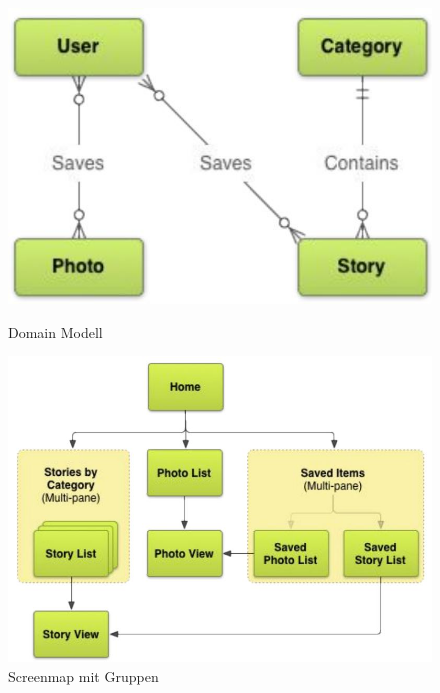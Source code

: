 \begin{figure}[ht!]
	\centering
	\begin{minipage}[t]{0.4\textwidth}
		\centering
		\includegraphics[width=0.7\linewidth]{images/domain_model}
		\caption{Domain Modell}
		\label{fig:domainmodel}
	\end{minipage}
	\begin{minipage}[t]{0.4\textwidth}
		\centering
		\includegraphics[width=0.7\linewidth]{images/screenmap}
		\caption{Screenmap mit Gruppen}
		\label{fig:screenmap}
	\end{minipage}
\end{figure}

